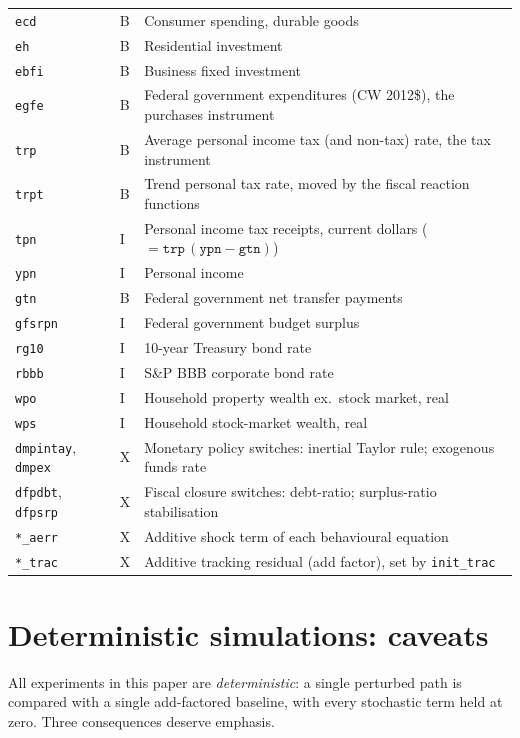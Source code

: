\begin{table}[htbp]
\begin{tabular}{llp{9.2cm}}
\texttt{ecd}    & B & Consumer spending, durable goods \\
\texttt{eh}     & B & Residential investment \\
\texttt{ebfi}   & B & Business fixed investment \\
\texttt{egfe}   & B & Federal government expenditures (CW 2012\$), the purchases instrument \\
\texttt{trp}    & B & Average personal income tax (and non-tax) rate, the tax instrument \\
\texttt{trpt}   & B & Trend personal tax rate, moved by the fiscal reaction functions \\
\texttt{tpn}    & I & Personal income tax receipts, current dollars ($=\texttt{trp}\,(\texttt{ypn}-\texttt{gtn})$) \\
\texttt{ypn}    & I & Personal income \\
\texttt{gtn}    & B & Federal government net transfer payments \\
\texttt{gfsrpn} & I & Federal government budget surplus \\
\texttt{rg10}   & I & 10-year Treasury bond rate \\
\texttt{rbbb}   & I & S\&P BBB corporate bond rate \\
\texttt{wpo}    & I & Household property wealth ex.\ stock market, real \\
\texttt{wps}    & I & Household stock-market wealth, real \\
\texttt{dmpintay}, \texttt{dmpex} & X & Monetary policy switches: inertial Taylor rule; exogenous funds rate \\
\texttt{dfpdbt}, \texttt{dfpsrp} & X & Fiscal closure switches: debt-ratio; surplus-ratio stabilisation \\
\texttt{*\_aerr} & X & Additive shock term of each behavioural equation \\
\texttt{*\_trac} & X & Additive tracking residual (add factor), set by \texttt{init\_trac} \\
\bottomrule
\end{tabular}
\end{table}

\section{Deterministic simulations: caveats}
\label{app:stochastic}

All experiments in this paper are \emph{deterministic}: a single perturbed path is compared with a single add-factored baseline, with every stochastic term held at zero. Three consequences deserve emphasis.

